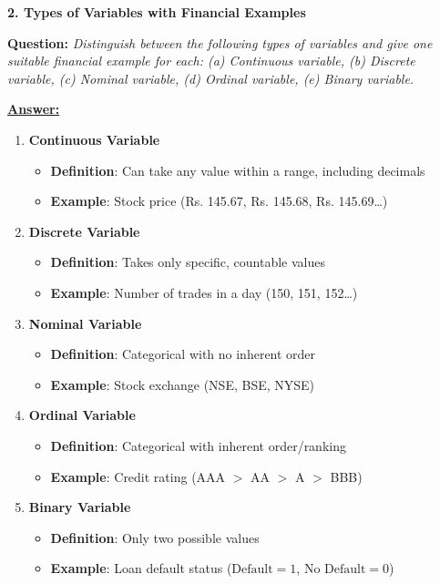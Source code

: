 \documentclass[11pt,a4paper]{article}
\newcommand{\questiontitle}[2]{%
    \vspace{0.4cm}%
    \noindent\textbf{\large\color{headerblue}#1. #2}\par\vspace{0.15cm}%
}
\newcommand{\qprompt}[1]{%
    \noindent\textbf{Question:} \textit{#1}\par\vspace{0.2cm}%
}
\newcommand{\answer}{\noindent\textbf{\underline{Answer:}}\par\vspace{0.15cm}}
\begin{document}
\vspace{0.35cm}

\questiontitle{2}{Types of Variables with Financial Examples}
\qprompt{Distinguish between the following types of variables and give one suitable financial example for each: (a) Continuous variable, (b) Discrete variable, (c) Nominal variable, (d) Ordinal variable, (e) Binary variable.}
\answer
\begin{enumerate}[label=\textbf{(\alph*)}]
    \item \textbf{Continuous Variable}
    \begin{itemize}
        \item \textbf{Definition}: Can take any value within a range, including decimals
        \item \textbf{Example}: Stock price (Rs. 145.67, Rs. 145.68, Rs. 145.69\dots)
    \end{itemize}

    \item \textbf{Discrete Variable}
    \begin{itemize}
        \item \textbf{Definition}: Takes only specific, countable values
        \item \textbf{Example}: Number of trades in a day (150, 151, 152\dots)
    \end{itemize}

    \item \textbf{Nominal Variable}
    \begin{itemize}
        \item \textbf{Definition}: Categorical with no inherent order
        \item \textbf{Example}: Stock exchange (NSE, BSE, NYSE)
    \end{itemize}

    \item \textbf{Ordinal Variable}
    \begin{itemize}
        \item \textbf{Definition}: Categorical with inherent order/ranking
        \item \textbf{Example}: Credit rating (AAA $>$ AA $>$ A $>$ BBB)
    \end{itemize}

    \item \textbf{Binary Variable}
    \begin{itemize}
        \item \textbf{Definition}: Only two possible values
        \item \textbf{Example}: Loan default status ($\text{Default} = 1$, $\text{No Default} = 0$)
    \end{itemize}
\end{enumerate}
\end{document}
